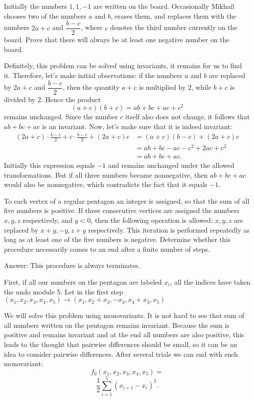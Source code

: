 \begin{example} 
Initially the numbers $1,1,-1$ are written on the board. 
Occasionally Mikhail chooses two of the numbers $a$ and $b$, erases them, 
and replaces them with the numbers $2a+c$ and $\dfrac{b-c}{2}$, 
where $c$ denotes the third number currently on the board. 
Prove that there will always be at least one negative number on the board.
\end{example}
\sol 
Definitely, this problem can be solved using invariants, it remains for us to find it. Therefore, let's make initial observations: if the numbers $a$ and $b$ are replaced by $2a+c$ and $\dfrac{b-c}{2}$, then the quantity $a+c$ is multiplied by $2$, while $b+c$ is divided by $2$. Hence the product
\[
(a+c)(b+c)=ab+bc+ac+c^2
\]
remains unchanged. Since the number $c$ itself also does not change, it follows that $ab+bc+ac$ is an invariant.
Now, let's make sure that it is indeed invariant:
$$
\begin{aligned}
(2a+c)\cdot\frac{b-c}{2}+c\cdot\frac{b-c}{2}+(2a+c)c
&= (a+c)(b-c)+(2a+c)c\\
&= ab+bc-ac-c^2+2ac+c^2\\
&= ab+bc+ac.
\end{aligned}
$$
Initially this expression equals $-1$ and remains unchanged under the allowed transformations. But if all three numbers became nonnegative, then $ab+bc+ac$ would also be nonnegative, which contradicts the fact that it equals $-1$.

\begin{example}[IMO 1986]
    To each vertex of a regular pentagon an integer is assigned, so that the sum of all five numbers is positive. If three consecutive vertices are assigned the numbers $x,y,z$ respectively, and $y<0$, then the following operation is allowed: $x,y,z$ are replaced by $x+y,-y,z+y$ respectively. This iteration is performed repeatedly as long as at least one of the five numbers is negative. Determine whether this procedure necessarily comes to an end after a finite number of steps.
\end{example}

\sol Answer: This procedure is always terminates.

First, if all our numbers on the pentagon are labeled $x_i$, all the indices have taken the undo module 5. Let in the first step $(x_1,x_2,x_3,x_4,x_5) \to (x_1,x_2+x_3,-x_3,x_4+x_3,x_5)$

We will solve this problem using monovariants. It is not hard to see that sum of all numbers written on the pentagon remains invariant. Because the sum is positive and remains invariant and at the end all numbers are also positive, this leads to the thought that pairwise differences should be small, so it can be an idea to consider pairwise differences. After several trials we can end with such monovariant: \[f_0(x_1,x_2,x_3,x_4,x_5)=\] \[\frac{1}{2} \sum_{i=1}^5 (x_{i+1}-x_i)^2.\]

